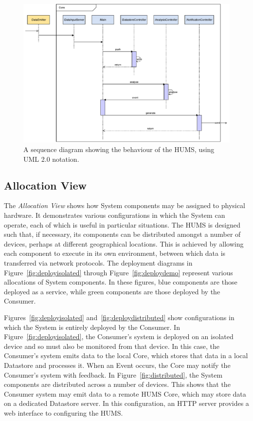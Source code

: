 \documentclass[10pt,a4paper]{article}
\begin{document}
\begin{figure}[h]
  \centering
  \includegraphics[width=\textwidth]{images/behaviourView.pdf}
  \caption{A sequence diagram showing the behaviour of the HUMS, using UML 2.0 notation.}
  \label{fig:sequence}
\end{figure}

\subsection{Allocation View}

The \emph{Allocation View} shows how System components may be assigned to physical hardware. It demonstrates various configurations in which the System can operate, each of which is useful in particular situations. The HUMS is designed such that, if necessary, its components can be distributed amongst a number of devices, perhaps at different geographical locations. This is achieved by allowing each component to execute in its own environment, between which data is transferred via network protocols. The deployment diagrams in Figure~\ref{fig:deployisolated} through Figure~\ref{fig:deploydemo} represent various allocations of System components. In these figures, blue components are those deployed as a service, while green components are those deployed by the Consumer.

Figures~\ref{fig:deployisolated} and~\ref{fig:deploydistributed} show configurations in which the System is entirely deployed by the Consumer. In Figure~\ref{fig:deployisolated}, the Consumer's system is deployed on an isolated device and so must also be monitored from that device. In this case, the Consumer's system emits data to the local Core, which stores that data in a local Datastore and processes it. When an Event occurs, the Core may notify the Consumer's system with feedback. In Figure~\ref{fig:distributed}, the System components are distributed across a number of devices. This shows that the Consumer system may emit data to a remote HUMS Core, which may store data on a dedicated Datastore server. In this configuration, an HTTP server provides a web interface to configuring the HUMS.
\end{document}
